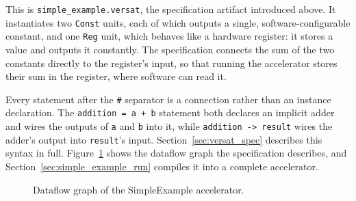 %

This is \texttt{simple\_example.versat}, the specification artifact introduced above. It instantiates two \texttt{Const} units, each of which outputs a single, software-configurable constant, and one \texttt{Reg} unit, which behaves like a hardware register: it stores a value and outputs it constantly. The specification connects the sum of the two constants directly to the register's input, so that running the accelerator stores their sum in the register, where software can read it.

Every statement after the \texttt{\#} separator is a connection rather than an instance declaration. The \texttt{addition = a + b} statement both declares an implicit adder and wires the outputs of \texttt{a} and \texttt{b} into it, while \texttt{addition -> result} wires the adder's output into \texttt{result}'s input. Section~\ref{sec:versat_spec} describes this syntax in full. Figure~\ref{fig:simple_example_graph} shows the dataflow graph the specification describes, and Section~\ref{sec:simple_example_run} compiles it into a complete accelerator.



\begin{figure}[H]
\centering
{}
\caption{Dataflow graph of the SimpleExample accelerator.}
\label{fig:simple_example_graph}
\end{figure}
